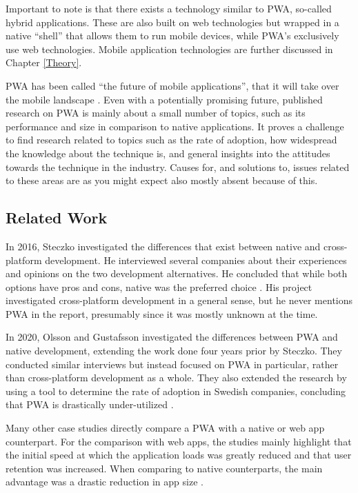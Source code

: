 \documentclass[a4paper,12pt]{article}
\begin{document}
Important to note is that there exists a technology similar to PWA, so-called hybrid applications. These are also built on web technologies but wrapped in a native “shell” that allows them to run mobile devices, while PWA’s exclusively use web technologies. Mobile application technologies are further discussed in Chapter \ref{Theory}.

PWA has been called “the future of mobile applications”, that it will take over the mobile landscape \cite{casestudies_mia, futureofweb_claim1}. Even with a potentially promising future, published research on PWA is mainly about a small number of topics, such as its performance and size in comparison to native applications. It proves a challenge to find research related to topics such as the rate of adoption, how widespread the knowledge about the technique is, and general insights into the attitudes towards the technique in the industry. Causes for, and solutions to, issues related to these areas are as you might expect also mostly absent because of this.

\subsection{Related Work}
\label{Intro_relatedWork}
In 2016, Steczko investigated the differences that exist between native and cross-platform development. He interviewed several companies about their experiences and opinions on the two development alternatives. He concluded that while both options have pros and cons, native was the preferred choice \cite{thesis_steczko}. His project investigated cross-platform development in a general sense, but he never mentions PWA in the report, presumably since it was mostly unknown at the time.

In 2020, Olsson and Gustafsson investigated the differences between PWA and native development, extending the work done four years prior by Steczko. They conducted similar interviews but instead focused on PWA in particular, rather than cross-platform development as a whole. They also extended the research by using a tool to determine the rate of adoption in Swedish companies, concluding that PWA is drastically under-utilized \cite{thesis_sverige}.

Many other case studies directly compare a PWA with a native or web app counterpart. For the comparison with web apps, the studies mainly highlight that the initial speed at which the application loads was greatly reduced and that user retention was increased. When comparing to native counterparts, the main advantage was a drastic reduction in app size \cite{casestudies_mia, thesis_pwa_2017, casestudies_google_1, casestudies_google_2, realize_native_with_pwa}.
\end{document}

